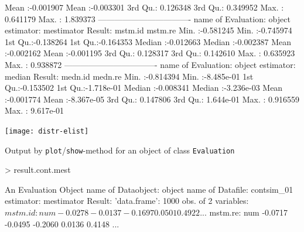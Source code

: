 \documentclass[11pt]{article}
\newcommand{\code}[1]{{\tt #1}}
\begin{document}
\begin{Schunk}
\begin{Soutput}
 Mean   :-0.001907   Mean   :-0.003301
 3rd Qu.: 0.126348   3rd Qu.: 0.349952
 Max.   : 0.641179   Max.   : 1.839373
----------------------------------
name of Evaluation: object
estimator: mestimator
Result:
    mstm.id             mstm.re
 Min.   :-0.581245   Min.   :-0.745974
 1st Qu.:-0.138264   1st Qu.:-0.164353
 Median :-0.012663   Median :-0.002387
 Mean   :-0.002162   Mean   :-0.001195
 3rd Qu.: 0.128317   3rd Qu.: 0.142610
 Max.   : 0.635923   Max.   : 0.938872
----------------------------------
name of Evaluation: object
estimator: median
Result:
    medn.id             medn.re
 Min.   :-0.814394   Min.   :-8.485e-01
 1st Qu.:-0.153502   1st Qu.:-1.718e-01
 Median :-0.008341   Median :-3.236e-03
 Mean   :-0.001774   Mean   :-8.367e-05
 3rd Qu.: 0.147806   3rd Qu.: 1.644e-01
 Max.   : 0.916559   Max.   : 9.617e-01
\end{Soutput}
\end{Schunk}
\texttt{[image: distr-elist]}
\par
\begin{footnotesize}
Output by \code{plot}/\code{show}-method for an object of class \code{Evaluation}
\begin{Schunk}
\begin{Sinput}
> result.cont.mest
\end{Sinput}
\begin{Soutput}
An Evaluation Object
name of Dataobject: object
name of Datafile: contsim_01
estimator: mestimator
Result: 'data.frame':	1000 obs. of  2 variables:
 $ mstm.id: num  -0.0278 -0.0137 -0.1697  0.0501  0.4922 ...
 $ mstm.re: num  -0.0717 -0.0495 -0.2060  0.0136  0.4148 ...
\end{Soutput}
\end{Schunk}
\end{footnotesize}
\end{document}
